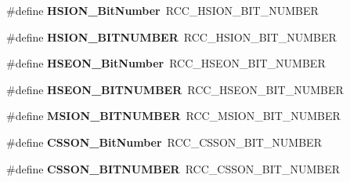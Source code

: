 \begin{DoxyCompactItemize}
\item 
\hypertarget{group___h_a_l___r_c_c___aliased_ga3d3085e491cbef815d223afbe5bf1930}{\#define {\bfseries H\-S\-I\-O\-N\-\_\-\-Bit\-Number}~R\-C\-C\-\_\-\-H\-S\-I\-O\-N\-\_\-\-B\-I\-T\-\_\-\-N\-U\-M\-B\-E\-R}\label{group___h_a_l___r_c_c___aliased_ga3d3085e491cbef815d223afbe5bf1930}

\item 
\hypertarget{group___h_a_l___r_c_c___aliased_ga79f147c8b2f8fe05574f861483be5aa4}{\#define {\bfseries H\-S\-I\-O\-N\-\_\-\-B\-I\-T\-N\-U\-M\-B\-E\-R}~R\-C\-C\-\_\-\-H\-S\-I\-O\-N\-\_\-\-B\-I\-T\-\_\-\-N\-U\-M\-B\-E\-R}\label{group___h_a_l___r_c_c___aliased_ga79f147c8b2f8fe05574f861483be5aa4}

\item 
\hypertarget{group___h_a_l___r_c_c___aliased_ga7b52a4205001d305fb5ef1d6b5bfd2cd}{\#define {\bfseries H\-S\-E\-O\-N\-\_\-\-Bit\-Number}~R\-C\-C\-\_\-\-H\-S\-E\-O\-N\-\_\-\-B\-I\-T\-\_\-\-N\-U\-M\-B\-E\-R}\label{group___h_a_l___r_c_c___aliased_ga7b52a4205001d305fb5ef1d6b5bfd2cd}

\item 
\hypertarget{group___h_a_l___r_c_c___aliased_ga6ca813609511152216b194e490bef027}{\#define {\bfseries H\-S\-E\-O\-N\-\_\-\-B\-I\-T\-N\-U\-M\-B\-E\-R}~R\-C\-C\-\_\-\-H\-S\-E\-O\-N\-\_\-\-B\-I\-T\-\_\-\-N\-U\-M\-B\-E\-R}\label{group___h_a_l___r_c_c___aliased_ga6ca813609511152216b194e490bef027}

\item 
\hypertarget{group___h_a_l___r_c_c___aliased_ga269ef9e8d23c9ea0c0a0df0d361c3467}{\#define {\bfseries M\-S\-I\-O\-N\-\_\-\-B\-I\-T\-N\-U\-M\-B\-E\-R}~R\-C\-C\-\_\-\-M\-S\-I\-O\-N\-\_\-\-B\-I\-T\-\_\-\-N\-U\-M\-B\-E\-R}\label{group___h_a_l___r_c_c___aliased_ga269ef9e8d23c9ea0c0a0df0d361c3467}

\item 
\hypertarget{group___h_a_l___r_c_c___aliased_ga253fa44d87aabc55f0cd6628e77a51fd}{\#define {\bfseries C\-S\-S\-O\-N\-\_\-\-Bit\-Number}~R\-C\-C\-\_\-\-C\-S\-S\-O\-N\-\_\-\-B\-I\-T\-\_\-\-N\-U\-M\-B\-E\-R}\label{group___h_a_l___r_c_c___aliased_ga253fa44d87aabc55f0cd6628e77a51fd}

\item 
\hypertarget{group___h_a_l___r_c_c___aliased_ga993cf17c844a51d912cf099d4117bd70}{\#define {\bfseries C\-S\-S\-O\-N\-\_\-\-B\-I\-T\-N\-U\-M\-B\-E\-R}~R\-C\-C\-\_\-\-C\-S\-S\-O\-N\-\_\-\-B\-I\-T\-\_\-\-N\-U\-M\-B\-E\-R}\label{group___h_a_l___r_c_c___aliased_ga993cf17c844a51d912cf099d4117bd70}


\end{DoxyCompactItemize}
